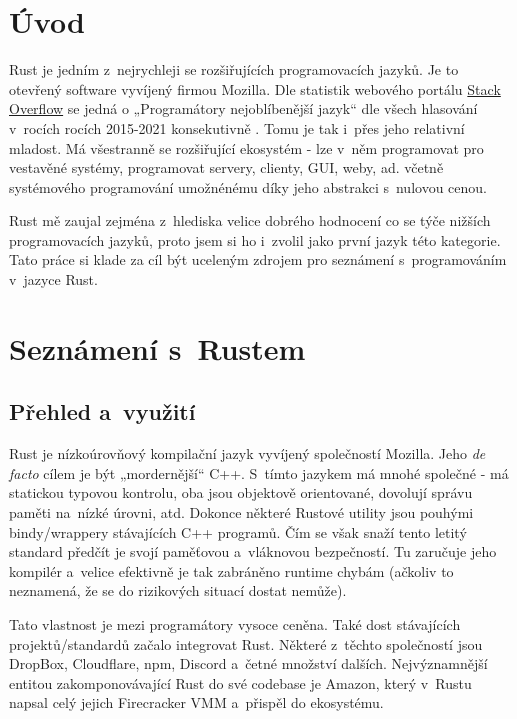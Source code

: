 \documentclass[a4paper, 12pt, twoside]{article} %
\begin{document}
\tableofcontents

\newpage


\section*{Úvod}
	Rust je jedním z~nejrychleji se rozšiřujících programovacích jazyků. Je to otevřený software vyvíjený firmou Mozilla. Dle statistik webového portálu \href{https://stackoverflow.com/}{Stack Overflow} se jedná o  „Programátory nejoblíbenější jazyk“ dle všech hlasování v~rocích rocích 2015-2021 konsekutivně \cite{stack}. Tomu je tak i~přes jeho relativní mladost. Má všestranně se rozšiřující ekosystém - lze v~něm programovat pro vestavěné systémy, programovat servery, clienty, GUI, weby, ad. včetně systémového programování umožnénému díky jeho abstrakci s~nulovou cenou.

	Rust mě zaujal zejména z~hlediska velice dobrého hodnocení co se týče nižších programovacích jazyků, proto jsem si ho i~zvolil jako první jazyk této kategorie. Tato práce si klade za cíl být uceleným zdrojem pro seznámení s~programováním v~jazyce Rust.


\section*{Seznámení s~Rustem}
	\subsection{Přehled a~využití}
		Rust je nízkoúrovňový kompilační jazyk vyvíjený společností Mozilla. Jeho \textit{de facto} cílem je být „mordernější“ C++. S~tímto jazykem má mnohé společné - má statickou typovou kontrolu, oba jsou objektově orientované, dovolují správu paměti na~nízké úrovni, atd. Dokonce některé Rustové utility jsou pouhými bindy/wrappery stávajících C++ programů. Čím se však snaží tento letitý standard předčít je svojí paměťovou a~vláknovou bezpečností. Tu zaručuje jeho kompilér a~velice efektivně je tak zabráněno runtime chybám (ačkoliv to neznamená, že se do rizikových situací dostat nemůže).

		Tato vlastnost je mezi programátory vysoce ceněna. Také dost stávajících projektů/standardů začalo integrovat Rust. Některé z~těchto společností jsou DropBox\cite{dropbox}, Cloudflare\cite{cloudflare}, npm\cite{npm}, Discord\cite{discord} a~četné množství dalších. Nejvýznamnější entitou zakomponovávající Rust do své codebase je Amazon\cite{amazon}, který v~Rustu napsal celý jejich Firecracker VMM a~přispěl do ekosystému.
\end{document}
